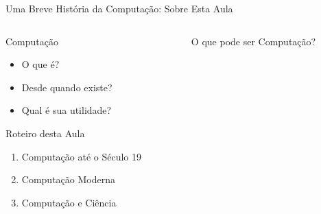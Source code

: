 \documentclass[10pt, compress, aspectratio=169, xcolor={table,usenames,dvipsnames}]{beamer}
\begin{document}
\begin{frame}[label={sec:orgadf1db2}]{Uma Breve História da Computação: Sobre Esta Aula}
\begin{columns}
\begin{column}{0.5\columnwidth}
\begin{block}{Computação}
\begin{itemize}
\item \alert{O que é}?
\item \alert{Desde quando} existe?
\item Qual é sua \alert{utilidade}?
\end{itemize}

\begin{block}{Roteiro desta Aula}
\begin{enumerate}
\item Computação até o \alert{Século 19}
\item Computação \alert{Moderna}
\item Computação e \alert{Ciência}
\end{enumerate}
\end{block}
\end{block}
\end{column}

\begin{column}{0.5\columnwidth}
\begin{block}{O que pode ser Computação?}



\end{block}
\end{column}
\end{columns}
\end{frame}
\end{document}
